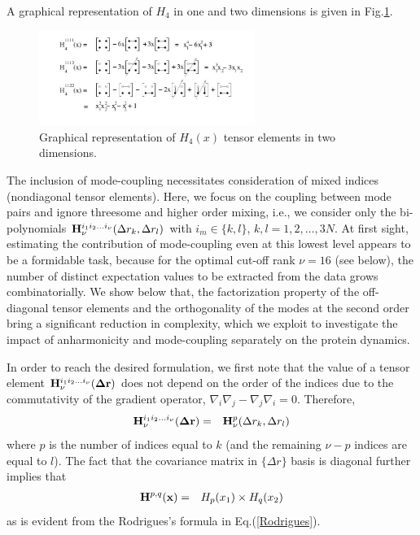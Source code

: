 \documentclass{article}
\begin{document}
A graphical representation of $H_4$ in one and two dimensions is given in Fig.\ref{Fig1}. 
\begin{figure}
\vspace*{2cm}
  \begin{center}
    \includegraphics[width=7cm]{./Fig1.jpeg}
  \end{center}
\caption{ Graphical representation of $H_4(x)$ tensor elements in two dimensions.}
\label{Fig1}
\end{figure}

The inclusion of mode-coupling necessitates consideration of mixed
indices (nondiagonal tensor elements). Here, we focus on the coupling
between mode pairs and ignore threesome and higher order mixing, i.e.,
we consider only the bi-polynomials ${\bf H}^{i_1i_2\dots
  i_\nu}_\nu(\Delta r_k,\Delta r_l)$ with $i_m \in \{k,l\}$,
$k,l=1,2,\dots,3N$. At first sight, estimating the contribution of
mode-coupling even at this lowest level appears to be a formidable
task, because for the optimal cut-off rank $\nu=16$ (see below), the
number of distinct expectation values to be extracted from the data
grows combinatorially. We show below that, the factorization property
of the off-diagonal tensor elements and the orthogonality of the modes
at the second order bring a significant reduction in complexity, which
we exploit to investigate the impact of anharmonicity and
mode-coupling separately on the protein dynamics.

In order to reach the desired formulation, we first note that the value
of a tensor element ${\bf H}^{i_1i_2\dots i_\nu}_\nu({\bf \Delta r})$
does not depend on the order of the indices due to the commutativity
of the gradient operator, $\nabla_i\nabla_j -
\nabla_j\nabla_i=0$. Therefore,
\begin{eqnarray}
{\bf H}^{i_1i_2\dots i_\nu}_\nu({\bf \Delta r}) &=& {\bf H}^p_\nu(\Delta r_k,\Delta r_l) \nonumber \\
\end{eqnarray}
where $p$ is the number of indices equal to $k$ (and the remaining
$\nu-p$ indices are equal to $l$). The fact that the covariance matrix
in $\{\Delta r\}$ basis is diagonal further implies that
\begin{eqnarray}
\label{factorization}
{\bf H}^{p,q}({\bf x}) &=& H_p(x_1)\times H_q(x_2)
\end{eqnarray}
as is evident from the Rodrigues's formula in Eq.(\ref{Rodrigues}).
\end{document}
